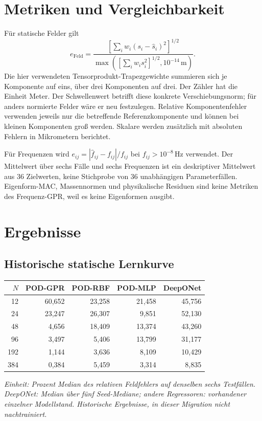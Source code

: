 \documentclass[11pt,a4paper]{article}
\begin{document}
\section{Metriken und Vergleichbarkeit}
Für statische Felder gilt
\begin{equation}
 e_{\mathrm{Feld}}=
 \frac{\left[\sum_i w_i(s_i-\widehat s_i)^2\right]^{1/2}}
 {\max\left(\left[\sum_i w_i s_i^2\right]^{1/2},10^{-14}\,\mathrm m\right)}.
\end{equation}
Die hier verwendeten Tensorprodukt-Trapezgewichte summieren sich je Komponente auf eins, über drei Komponenten auf drei. Der Zähler hat die Einheit Meter. Der Schwellenwert betrifft diese konkrete Verschiebungsnorm; für anders normierte Felder wäre er neu festzulegen. Relative Komponentenfehler verwenden jeweils nur die betreffende Referenzkomponente und können bei kleinen Komponenten groß werden. Skalare werden zusätzlich mit absoluten Fehlern in Mikrometern berichtet.

Für Frequenzen wird $e_{ij}=|\widehat f_{ij}-f_{ij}|/f_{ij}$ bei $f_{ij}>10^{-8}$\,Hz verwendet. Der Mittelwert über sechs Fälle und sechs Frequenzen ist ein deskriptiver Mittelwert aus 36 Zielwerten, keine Stichprobe von 36 unabhängigen Parameterfällen. Eigenform-MAC, Massennormen und physikalische Residuen sind keine Metriken des Frequenz-GPR, weil es keine Eigenformen ausgibt.

\section{Ergebnisse}
\subsection{Historische statische Lernkurve}
\begin{center}
\begin{tabular}{rrrrr}
\toprule
$N$ & POD-GPR & POD-RBF & POD-MLP & DeepONet\\
\midrule
12 & 60,652 & 23,258 & 21,458 & 45,756\\
24 & 23,247 & 26,307 & 9,851 & 52,130\\
48 & 4,656 & 18,409 & 13,374 & 43,260\\
96 & 3,497 & 5,406 & 13,799 & 31,177\\
192 & 1,144 & 3,636 & 8,109 & 10,429\\
384 & 0,384 & 5,459 & 3,314 & 8,835\\
\bottomrule
\end{tabular}
\end{center}
\emph{Einheit: Prozent Median des relativen Feldfehlers auf denselben sechs Testfällen. DeepONet: Median über fünf Seed-Mediane; andere Regressoren: vorhandener einzelner Modellstand. Historische Ergebnisse, in dieser Migration nicht nachtrainiert.}
\end{document}
